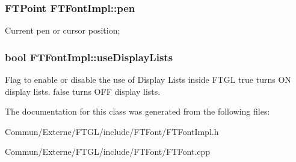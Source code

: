 \subsubsection[{\texorpdfstring{pen}{pen}}]{\setlength{\rightskip}{0pt plus 5cm}F\+T\+Point F\+T\+Font\+Impl\+::pen\hspace{0.3cm}{\ttfamily [private]}}\hypertarget{class_f_t_font_impl_a7746a7659e50cb09906a408b49ac22e8}{}\label{class_f_t_font_impl_a7746a7659e50cb09906a408b49ac22e8}
Current pen or cursor position; 
\subsubsection[{\texorpdfstring{use\+Display\+Lists}{useDisplayLists}}]{\setlength{\rightskip}{0pt plus 5cm}bool F\+T\+Font\+Impl\+::use\+Display\+Lists\hspace{0.3cm}{\ttfamily [protected]}}\hypertarget{class_f_t_font_impl_a5c21ea909477c7180b86625fef6af457}{}\label{class_f_t_font_impl_a5c21ea909477c7180b86625fef6af457}
Flag to enable or disable the use of Display Lists inside F\+T\+GL {\ttfamily true} turns ON display lists. {\ttfamily false} turns O\+FF display lists. 

The documentation for this class was generated from the following files\+:\begin{DoxyCompactItemize}
\item 
Commun/\+Externe/\+F\+T\+G\+L/include/\+F\+T\+Font/F\+T\+Font\+Impl.\+h\item 
Commun/\+Externe/\+F\+T\+G\+L/include/\+F\+T\+Font/F\+T\+Font.\+cpp\end{DoxyCompactItemize}
